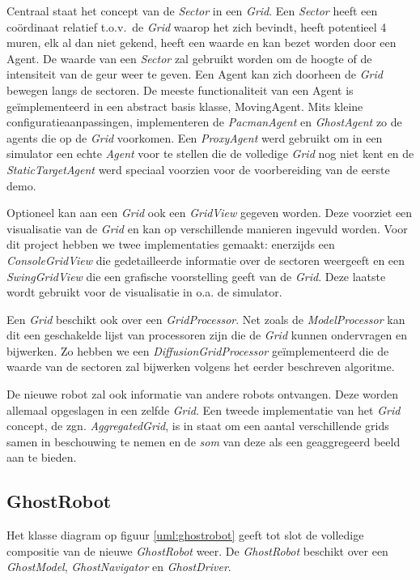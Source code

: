 \documentclass[12pt,a4paper]{report}
\begin{document}
Centraal staat het concept van de \emph{Sector} in een \emph{Grid}. Een \emph{Sector} heeft een co\"ordinaat relatief t.o.v.\ de \emph{Grid} waarop het zich bevindt, heeft potentieel 4 muren, elk al dan niet gekend, heeft een waarde en kan bezet worden door een Agent. De waarde van een \emph{Sector} zal gebruikt worden om de hoogte of de intensiteit van de geur weer te geven. Een Agent kan zich doorheen de \emph{Grid} bewegen langs de sectoren. De meeste functionaliteit van een Agent is ge\"implementeerd in een abstract basis klasse, MovingAgent. Mits kleine configuratieaanpassingen, implementeren de \emph{PacmanAgent} en \emph{GhostAgent} zo de agents die op de \emph{Grid} voorkomen. Een \emph{ProxyAgent} werd gebruikt om in een simulator een echte \emph{Agent} voor te stellen die de volledige \emph{Grid} nog niet kent en de \emph{StaticTargetAgent} werd speciaal voorzien voor de voorbereiding van de eerste demo.

Optioneel kan aan een \emph{Grid} ook een \emph{GridView} gegeven worden. Deze voorziet een visualisatie van de \emph{Grid} en kan op verschillende manieren ingevuld worden. Voor dit project hebben we twee implementaties gemaakt: enerzijds een \emph{ConsoleGridView} die gedetailleerde informatie over de sectoren weergeeft en een \emph{SwingGridView} die een grafische voorstelling geeft van de \emph{Grid}. Deze laatste wordt gebruikt voor de visualisatie in o.a. de simulator.

Een \emph{Grid} beschikt ook over een \emph{GridProcessor}. Net zoals de \emph{ModelProcessor} kan dit een geschakelde lijst van processoren zijn die de \emph{Grid} kunnen ondervragen en bijwerken. Zo hebben we een \emph{DiffusionGridProcessor} ge\"implementeerd die de waarde van de sectoren zal bijwerken volgens het eerder beschreven algoritme.

De nieuwe robot zal ook informatie van andere robots ontvangen. Deze worden allemaal opgeslagen in een zelfde \emph{Grid}. Een tweede implementatie van het \emph{Grid} concept, de zgn. \emph{AggregatedGrid}, is in staat om een aantal verschillende grids samen in beschouwing te nemen en de \emph{som} van deze als een geaggregeerd beeld aan te bieden.

\subsection{GhostRobot}

Het klasse diagram op figuur \ref{uml:ghostrobot} geeft tot slot de volledige compositie van de nieuwe \emph{GhostRobot} weer. De \emph{GhostRobot} beschikt over een \emph{GhostModel}, \emph{GhostNavigator} en \emph{GhostDriver}.
\end{document}
